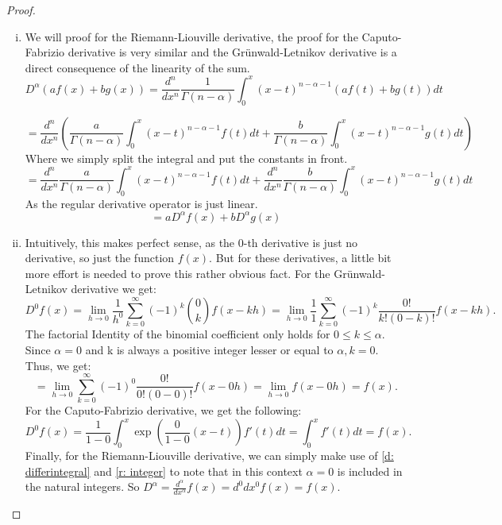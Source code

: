 \begin{proof}
    \begin{enumerate}[(i)]
        \item We will proof for the Riemann-Liouville derivative, the proof for the Caputo-Fabrizio derivative is very similar and the Grünwald-Letnikov derivative is a direct consequence of the linearity of the sum.
        \[ D^{\alpha} (a f(x) + b g(x)) = \frac{d^n}{dx^n}\frac{1}{\Gamma(n - \alpha)} \int_{0}^{x} (x - t)^{n - \alpha - 1} (a f(t) + b g(t)) dt \]
     
        \[= \frac{d^n}{dx^n}(\frac{a}{\Gamma(n - \alpha)} \int_{0}^{x} (x - t)^{n - \alpha - 1}  f(t)dt + \frac{b}{\Gamma(n - \alpha)} \int_{0}^{x} (x - t)^{n - \alpha - 1} g(t)dt) \] Where we simply split the integral and put the constants in front.
        \[= \frac{d^n}{dx^n}\frac{a}{\Gamma(n - \alpha)} \int_{0}^{x} (x - t)^{n - \alpha - 1}  f(t)dt + \frac{d^n}{dx^n} \frac{b}{\Gamma(n - \alpha)} \int_{0}^{x} (x - t)^{n - \alpha - 1} g(t)dt \] As the regular derivative operator is just linear.
        \[ = a D^{\alpha} f(x) + b D^{\alpha} g(x) \]
        \item Intuitively, this makes perfect sense, as the 0-th derivative is just no derivative, so just the function \(f(x)\). But for these derivatives, a little bit more effort is needed to prove this rather obvious fact.
        \newline 
        For the Grünwald-Letnikov derivative we get: \[D^0 f(x) = \lim_{h \to 0} \frac{1}{h^0} \sum_{k=0}^\infty (-1)^k \binom{0}{k} f(x - k h)
        = \lim_{h \to 0} \frac{1}{1} \sum_{k=0}^\infty (-1)^k \frac{0!}{k!(0- k)!} f(x - k h).\] The factorial Identity of the binomial coefficient only holds for \(0 \leq k \leq \alpha\). Since \(\alpha = 0\) and k is always a positive integer lesser or equal to \(\alpha, k = 0\). Thus, we get:
        \[ = \lim_{h \to 0} \sum_{k=0}^\infty (-1)^0 \frac{0!}{0!(0- 0)!} f(x - 0 h) = \lim_{h \to 0} f(x - 0 h) = f(x).\]
        \newline
        For the Caputo-Fabrizio derivative, we get the following:
        \[ D^{0} f(x) = \frac{1}{1 - 0}  \int_{0}^{x} \exp(\frac{0}{1 -0}(x-t)) f'(t) dt = \int_{0}^{x}f'(t) dt = f(x).\]
        \newline
        Finally, for the Riemann-Liouville derivative, we can simply make use of \ref{d: differintegral} and \ref{r: integer} to note that in this context \(\alpha = 0\) is included in the natural integers. So \(D^\alpha = \frac{d^\alpha}{dx^\alpha} f(x) = {d^0}{dx^0} f(x) = f(x)\).


\end{enumerate}
\end{proof}
